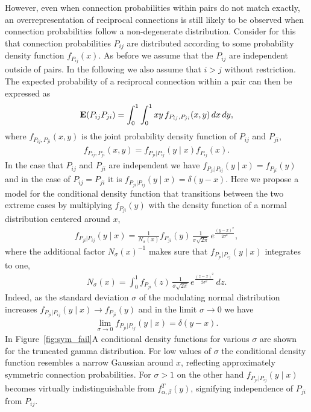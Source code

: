 However, even when connection probabilities within pairs do not match exactly, an overrepresentation of reciprocal connections is still likely to be observed when connection probabilities follow a non-degenerate distribution. Consider for this that connection probabilities $P_{ij}$ are distributed according to some probability density function $f_{P_{ij}}(x)$. As before we assume that the $P_{ij}$ are independent outside of pairs. In the following we also assume that $i > j$ without restriction. The expected probability of a reciprocal connection within a pair can then be expressed as
%
\begin{align}
  \operatorname{\mathbf{E}}(P_{ij}P_{ji}) = \int_0^1 \int_0^1 xy\, f_{P_{ij},P_{ji}}(x,y) \, dx\, dy, \label{eq:dbint}
\end{align}
%
where $f_{P_{ij},P_{ji}}(x,y)$ is the joint probability density function of $P_{ij}$ and $P_{ji}$, 
%
\begin{align}
  f_{P_{ij},P_{ji}}(x,y) =  f_{P_{ji} | P_{ij}}(y \mid x) f_{P_{ij}}(x). \label{eq:cdf_def}
\end{align}
%
In the case that $P_{ij}$ and $P_{ji}$ are independent we have $f_{P_{ji} | P_{ij}}(y \mid x) = f_{P_{ji}}(y)$ and in the case of $P_{ij}=P_{ji}$ it is $f_{P_{ji} | P_{ij}}(y \mid x) = \delta(y-x)$. Here we propose a model for the conditional density function that transitions between the two extreme cases by multiplying $f_{P_{ji}}(y)$ with the density function of a normal distribution centered around $x$,
%
\begin{align}
  f_{P_{ji} | P_{ij}} (y \mid x) = \frac{1}{N_{\sigma}(x)} f_{P_{ji}}(y)\, \frac{1}{\sigma \sqrt{2 \pi}} \,e^{\frac{(y-x)^2}{2 \sigma^2}} \label{eq:fpijpji},
\end{align}
%
where the additional factor $N_{\sigma}(x)^{-1}$  makes sure that $f_{P_{ji}|P_{ij}} (y \mid x)$ integrates to one,
%
\begin{align}
  N_{\sigma}(x) = \int_0^1 f_{P_{ji}}(z)\, \frac{1}{\sigma \sqrt{2 \pi}}\, e^{\frac{(z-x)^2}{2 \sigma^2}} \,dz.
\end{align}
%
Indeed, as the standard deviation $\sigma$ of the modulating normal distribution increases $f_{P_{ji}|P_{ij}} (y \mid x) \to f_{P_{ji}}(y)$ and in the limit $\sigma \to 0$ we have
\begin{align}
  \lim_{\sigma \to 0}   f_{P_{ji}|P_{ij}} (y \mid x) = \delta(y-x).
\end{align}
%
In Figure~\ref{fig:sym_fail}A  conditional density functions for various $\sigma$ are shown for the truncated gamma distribution. For low values of $\sigma$ the conditional density function resembles a narrow Gaussian around $x$, reflecting approximately symmetric connection probabilities. For $\sigma > 1$ on the other hand $f_{P_{ji} | P_{ij}}(y \mid x)$ becomes virtually indistinguishable from $f^T_{\alpha, \beta}(y)$, signifying independence of $P_{ji}$ from $P_{ij}$.

